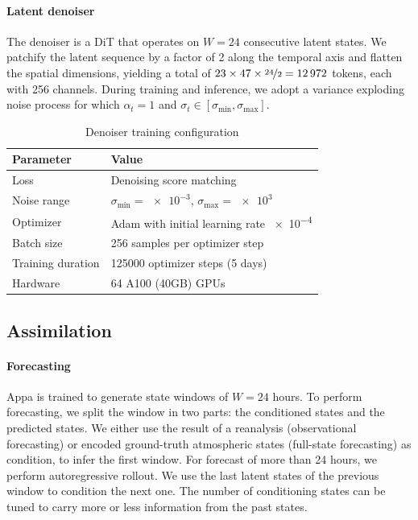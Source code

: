 \begin{subappendices}
\paragraph{Latent denoiser}
The denoiser is a DiT that operates on $W = 24$ consecutive latent states. We patchify the latent sequence by a factor of 2 along the temporal axis and flatten the spatial dimensions, yielding a total of $23 \times 47 \times \nicefrac{24}{2} = \num{12972}$ tokens, each with 256 channels. During training and inference, we adopt a variance exploding noise process \cite{song2019generative} for which $\alpha_t = 1$ and $\sigma_t \in [\sigma_{\min}, \sigma_{\max}]$.

\begin{table}[!h]
    \centering
    \caption{Denoiser training configuration}
    \begin{tabular}{ll}
        \toprule
        \textbf{Parameter} & \textbf{Value} \\
        \midrule
        Loss & Denoising score matching \\
        Noise range & $\sigma_{\min} = \num{e-3}$, $\sigma_{\max} = \num{e3}$ \\
        Optimizer & Adam \cite{kingma2015adam} with initial learning rate \num{e-4} \\
        Batch size & 256 samples per optimizer step\\
        Training duration & 125000 optimizer steps (5 days) \\
        Hardware & 64 A100 (40GB) GPUs \\
        \bottomrule
    \end{tabular}
    \label{tab:denoiser-training}
\end{table}

\subsection{Assimilation}

\paragraph{Forecasting}
Appa is trained to generate state windows of $W = 24$ hours. To perform forecasting, we split the window in two parts: the conditioned states and the predicted states. We either use the result of a reanalysis (observational forecasting) or encoded ground-truth atmospheric states (full-state forecasting) as condition, to infer the first window. For forecast of more than 24 hours, we perform autoregressive rollout. We use the last latent states of the previous window to condition the next one. The number of conditioning states can be tuned to carry more or less information from the past states.


\end{subappendices}
